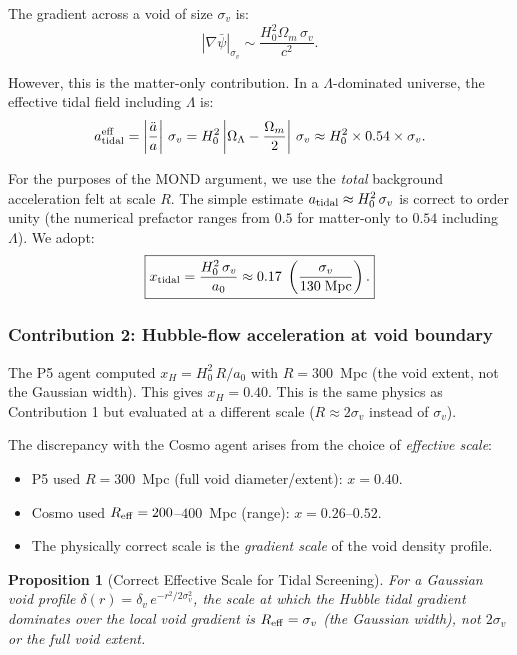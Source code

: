 \documentclass[11pt,a4paper]{article}
\newtheorem{proposition}{Proposition}
\newcommand{\aM}{a_0}
\newcommand{\Omm}{\Omega_m}
\newcommand{\OmL}{\Omega_\Lambda}
\begin{document}
The gradient across a void of size $\sigma_v$ is:
\begin{equation}
|\nabla\bar{\psi}|_{\sigma_v} \sim \frac{H_0^2\Omm\,\sigma_v}{c^2}.
\end{equation}

However, this is the matter-only contribution. In a $\Lambda$-dominated
universe, the effective tidal field including $\Lambda$ is:
\begin{equation}
a_{\rm tidal}^{\rm eff} = \left|\frac{\ddot{a}}{a}\right|\,\sigma_v
= H_0^2\left|\OmL - \frac{\Omm}{2}\right|\,\sigma_v
\approx H_0^2 \times 0.54 \times \sigma_v.
\label{eq:a-tidal-Lambda}
\end{equation}

For the purposes of the MOND argument, we use the \emph{total}
background acceleration felt at scale $R$. The simple estimate
$a_{\rm tidal} \approx H_0^2\,\sigma_v$ is correct to order unity
(the numerical prefactor ranges from $0.5$ for matter-only to
$0.54$ including $\Lambda$). We adopt:
\begin{equation}
\boxed{x_{\rm tidal} = \frac{H_0^2\,\sigma_v}{\aM}
\approx 0.17\;\left(\frac{\sigma_v}{130\;\text{Mpc}}\right).}
\label{eq:x-tidal-final}
\end{equation}


\subsubsection{Contribution 2: Hubble-flow acceleration at void boundary}

The P5 agent computed $x_H = H_0^2\,R/\aM$ with $R = 300$~Mpc
(the void extent, not the Gaussian width). This gives $x_H = 0.40$.
This is the same physics as Contribution 1 but evaluated at a
different scale ($R \approx 2\sigma_v$ instead of $\sigma_v$).

The discrepancy with the Cosmo agent arises from the choice of
\emph{effective scale}:
\begin{itemize}[nosep]
\item P5 used $R = 300$~Mpc (full void diameter/extent): $x = 0.40$.
\item Cosmo used $R_{\rm eff} = 200$--$400$~Mpc (range): $x = 0.26$--$0.52$.
\item The physically correct scale is the \emph{gradient scale}
  of the void density profile.
\end{itemize}

\begin{proposition}[Correct Effective Scale for Tidal Screening]
\label{prop:scale}
For a Gaussian void profile $\delta(r) = \delta_v\,e^{-r^2/2\sigma_v^2}$,
the scale at which the Hubble tidal gradient dominates over the local
void gradient is $R_{\rm eff} = \sigma_v$ (the Gaussian width), not
$2\sigma_v$ or the full void extent.
\end{proposition}
\end{document}
